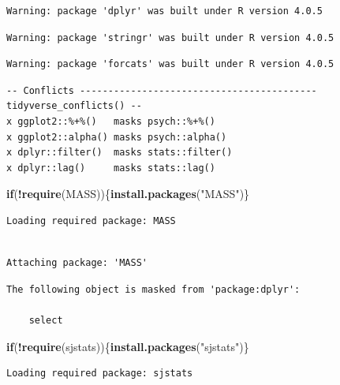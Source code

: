 \documentclass[
  english,
]{book}
\newenvironment{Shaded}{\begin{snugshade}}{\end{snugshade}}
\newcommand{\ControlFlowTok}[1]{\textcolor[rgb]{0.13,0.29,0.53}{\textbf{#1}}}
\newcommand{\KeywordTok}[1]{\textcolor[rgb]{0.13,0.29,0.53}{\textbf{#1}}}
\newcommand{\NormalTok}[1]{#1}
\newcommand{\OperatorTok}[1]{\textcolor[rgb]{0.81,0.36,0.00}{\textbf{#1}}}
\newcommand{\StringTok}[1]{\textcolor[rgb]{0.31,0.60,0.02}{#1}}
\begin{document}
\begin{verbatim}
Warning: package 'dplyr' was built under R version 4.0.5
\end{verbatim}

\begin{verbatim}
Warning: package 'stringr' was built under R version 4.0.5
\end{verbatim}

\begin{verbatim}
Warning: package 'forcats' was built under R version 4.0.5
\end{verbatim}

\begin{verbatim}
-- Conflicts ------------------------------------------ tidyverse_conflicts() --
x ggplot2::%+%()   masks psych::%+%()
x ggplot2::alpha() masks psych::alpha()
x dplyr::filter()  masks stats::filter()
x dplyr::lag()     masks stats::lag()
\end{verbatim}

\begin{Shaded}
\begin{Highlighting}[]
\ControlFlowTok{if}\NormalTok{(}\OperatorTok{!}\KeywordTok{require}\NormalTok{(MASS))\{}\KeywordTok{install.packages}\NormalTok{(}\StringTok{"MASS"}\NormalTok{)\}}
\end{Highlighting}
\end{Shaded}

\begin{verbatim}
Loading required package: MASS
\end{verbatim}

\begin{verbatim}

Attaching package: 'MASS'
\end{verbatim}

\begin{verbatim}
The following object is masked from 'package:dplyr':

    select
\end{verbatim}

\begin{Shaded}
\begin{Highlighting}[]
\ControlFlowTok{if}\NormalTok{(}\OperatorTok{!}\KeywordTok{require}\NormalTok{(sjstats))\{}\KeywordTok{install.packages}\NormalTok{(}\StringTok{"sjstats"}\NormalTok{)\}}
\end{Highlighting}
\end{Shaded}

\begin{verbatim}
Loading required package: sjstats
\end{verbatim}
\end{document}
